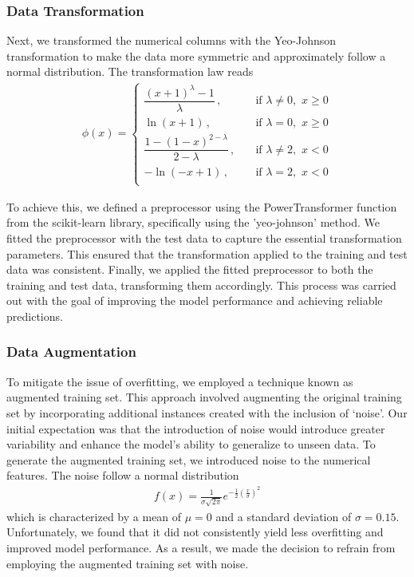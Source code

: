 \documentclass{article}
\begin{document}
\subsubsection{Data Transformation}
Next, we transformed the numerical columns with the Yeo-Johnson transformation\cite{yeo} to make the data more symmetric and approximately follow a normal distribution. The transformation law reads
\begin{align}
    \phi(x)=\begin{cases}
    \dfrac{(x+1)^\lambda-1}{\lambda}\,,\quad& \text{if}\,\,\lambda\neq 0,\,\, x\geq 0\\
    \ln(x+1)\,,\quad& \text{if}\,\,\lambda= 0,\,\, x\geq 0\\
    \dfrac{1-(1-x)^{2-\lambda}}{2-\lambda}\,,\quad&\text{if}\,\,\lambda\neq 2,\,\, x<0\\
    -\ln(-x+1)\,,\quad& \text{if}\,\,\lambda= 2,\,\, x< 0\\
    \end{cases}
\end{align}

\noindent To achieve this, we defined a preprocessor using the PowerTransformer function from the scikit-learn library, specifically using the 'yeo-johnson' method. We fitted the preprocessor with the test data to capture the essential transformation parameters. This ensured that the transformation applied to the training and test data was consistent. Finally, we applied the fitted preprocessor to both the training and test data, transforming them accordingly. This process was carried out with the goal of improving the model performance and achieving  reliable predictions.
\subsubsection{Data Augmentation}
To mitigate the issue of overfitting, we employed a technique known as augmented training set. This approach involved augmenting the original training set by incorporating additional instances created with the inclusion of `noise'. Our initial expectation was that the introduction of noise would introduce greater variability and enhance the model's ability to generalize to unseen data. To generate the augmented training set, we introduced noise to the numerical features. The noise follow a normal distribution
\begin{align}
f(x) = \frac{1}{\sigma\sqrt{2\pi}}e^{-\frac{1}{2}(\frac{x}{\sigma})^2}
\end{align}
which is characterized by a mean of $\mu=0$ and a standard deviation of $\sigma=0.15$.  Unfortunately, we found that it did not consistently yield less overfitting and improved model performance. As a result, we made the decision to refrain from employing the augmented training set with noise.
\newpage
\end{document}
